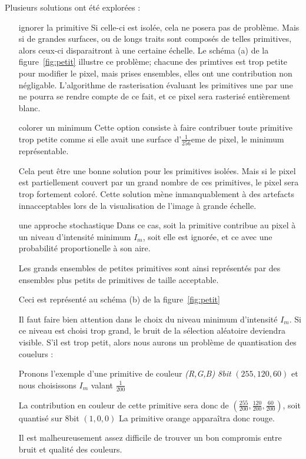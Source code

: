 			Plusieurs solutions ont été
			explorées :
			\begin{enumerate}
				\item[ignorer la primitive] Si celle-ci est isolée, cela ne posera pas de problème. Mais si
				de grandes surfaces, ou de longs traits sont composés de telles primitives, alors ceux-ci
				disparaitront à une certaine échelle. Le schéma (a) de la figure~\ref{fig:petit} illustre ce problème; chacune des primtives
				est trop petite pour modifier le pixel, mais prises ensembles, elles ont une contribution non
				négligable. L'algorithme de rasterisation évaluant les primitives une par une ne pourra se
				rendre compte de ce fait, et ce pixel sera rasterisé entièrement blanc.

				\item[colorer un minimum] Cette option consiste à faire contribuer toute primitive trop petite
				comme si elle avait une surface d'$\frac{1}{256}$eme de pixel, le minimum représentable. 

				Cela peut être une bonne solution pour les primitives isolées. Mais si le pixel est partiellement
				couvert par un grand nombre de ces primitives, le pixel sera trop fortement coloré. Cette solution
				mène inmanquablement à des artefacts innacceptables lors de la visualisation de l'image à grande échelle. 

				\item[une approche stochastique] Dans ce cas, soit la primitive contribue au pixel à un niveau
				d'intensité minimum $I_m$,  soit elle est ignorée, et ce avec une probabilité proportionelle à son aire. 
				
				Les grands ensembles de petites primitives sont ainsi représentés par des ensembles plus petits de 
				primitives de taille acceptable. 

				Ceci est représenté au schéma (b) de la figure~\ref{fig:petit}

				Il faut faire bien attention dans le choix du niveau minimum d'intensité $I_m$. Si ce niveau est
				choisi trop grand, le bruit de la sélection aléatoire deviendra visible. S'il est trop petit, 
				alors nous aurons un problème de quantisation des couelurs :

				Pronons l'exemple d'une primitive
				de couleur 
				\emph{(R,G,B) 8bit } $(255,120,60)$ et nous choisissons $I_m$ valant $\frac{1}{200}$ 
				
				La contribution en couleur de cette primitive sera donc de $(\frac{255}{200},\frac{120}{200},\frac{60}{200})$, soit
				quantisé sur 8bit $(1,0,0)$ La primitive orange apparaîtra donc rouge. 
				
				Il est malheureusement assez difficile de trouver un bon compromis entre bruit et qualité des couleurs. 
			\end{enumerate}

